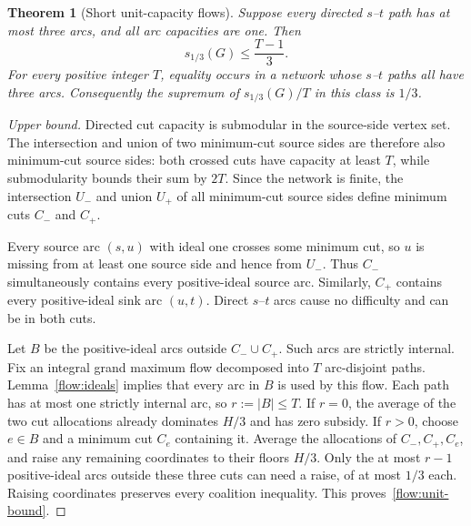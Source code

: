 \documentclass[11pt]{article}
\newtheorem{theorem}{Theorem}[section]
\theoremstyle{remark}
\begin{document}
\begin{theorem}[Short unit-capacity flows]\label{flow:unit}
Suppose every directed $s$--$t$ path has at most three arcs, and all arc
capacities are one. Then
\begin{equation}\label{flow:unit-bound}
                     s_{1/3}(G)\le\frac{T-1}{3}.
\end{equation}
For every positive integer $T$, equality occurs in a network whose
$s$--$t$ paths all have three arcs. Consequently the supremum of
$s_{1/3}(G)/T$ in this class is $1/3$.
\end{theorem}
\begin{proof}[Upper bound]
Directed cut capacity is submodular in the source-side vertex set.
The intersection and union of two minimum-cut source sides are therefore
also minimum-cut source sides: both crossed cuts have capacity at least
$T$, while submodularity bounds their sum by $2T$. Since the network is
finite, the intersection $U_-$ and union $U_+$ of all minimum-cut source
sides define minimum cuts $C_-$ and $C_+$.

Every source arc $(s,u)$ with ideal one crosses some minimum cut, so $u$
is missing from at least one source side and hence from $U_-$. Thus
$C_-$ simultaneously contains every positive-ideal source arc. Similarly,
$C_+$ contains every positive-ideal sink arc $(u,t)$. Direct $s$--$t$
arcs cause no difficulty and can be in both cuts.

Let $B$ be the positive-ideal arcs outside $C_-\cup C_+$. Such arcs are
strictly internal. Fix an integral grand maximum flow decomposed into
$T$ arc-disjoint paths. Lemma~\ref{flow:ideals} implies that every arc
in $B$ is used by this flow. Each path has at most one strictly internal
arc, so $r:=|B|\le T$. If $r=0$, the average of the two cut allocations
already dominates $H/3$ and has zero subsidy. If $r>0$, choose $e\in B$
and a minimum cut $C_e$ containing it. Average the allocations of
$C_-,C_+,C_e$, and raise any remaining coordinates to their floors $H/3$.
Only the at most $r-1$ positive-ideal arcs outside these three cuts can
need a raise, of at most $1/3$ each. Raising coordinates preserves every
coalition inequality. This proves~\eqref{flow:unit-bound}.
\end{proof}
\end{document}

